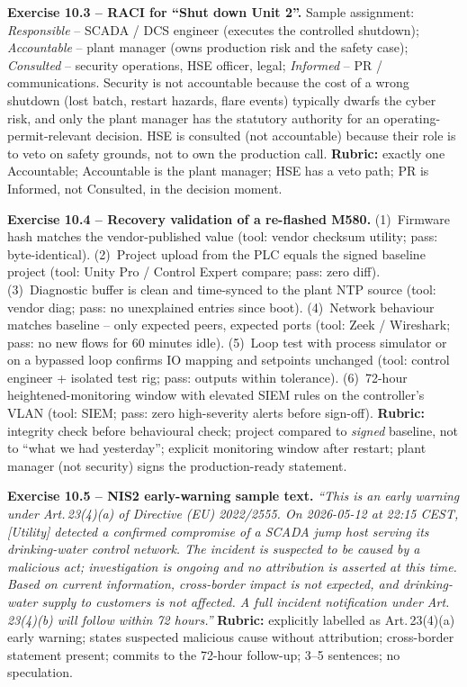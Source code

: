 \documentclass[11pt,a4paper]{article}
\begin{document}
\begin{solutionbox}
\textbf{Exercise 10.3 -- RACI for ``Shut down Unit 2''.}
Sample assignment: \emph{Responsible} -- SCADA / DCS engineer (executes the
controlled shutdown); \emph{Accountable} -- plant manager (owns production
risk and the safety case); \emph{Consulted} -- security operations, HSE
officer, legal; \emph{Informed} -- PR / communications. Security is not
accountable because the cost of a wrong shutdown (lost batch, restart hazards,
flare events) typically dwarfs the cyber risk, and only the plant manager has
the statutory authority for an operating-permit-relevant decision. HSE is
consulted (not accountable) because their role is to veto on safety grounds,
not to own the production call. \textbf{Rubric:} exactly one Accountable;
Accountable is the plant manager; HSE has a veto path; PR is Informed, not
Consulted, in the decision moment.
\end{solutionbox}

\begin{solutionbox}
\textbf{Exercise 10.4 -- Recovery validation of a re-flashed M580.}
(1)~Firmware hash matches the vendor-published value (tool: vendor checksum
utility; pass: byte-identical). (2)~Project upload from the PLC equals the
signed baseline project (tool: Unity Pro / Control Expert compare; pass: zero
diff). (3)~Diagnostic buffer is clean and time-synced to the plant NTP source
(tool: vendor diag; pass: no unexplained entries since boot). (4)~Network
behaviour matches baseline -- only expected peers, expected ports (tool:
Zeek / Wireshark; pass: no new flows for 60 minutes idle). (5)~Loop test with
process simulator or on a bypassed loop confirms IO mapping and setpoints
unchanged (tool: control engineer + isolated test rig; pass: outputs within
tolerance). (6)~72-hour heightened-monitoring window with elevated SIEM rules
on the controller's VLAN (tool: SIEM; pass: zero high-severity alerts before
sign-off). \textbf{Rubric:} integrity check before behavioural check; project
compared to \emph{signed} baseline, not to ``what we had yesterday''; explicit
monitoring window after restart; plant manager (not security) signs the
production-ready statement.
\end{solutionbox}

\begin{solutionbox}
\textbf{Exercise 10.5 -- NIS2 early-warning sample text.}
\emph{``This is an early warning under Art.\,23(4)(a) of Directive (EU)
2022/2555. On 2026-05-12 at 22:15 CEST, [Utility] detected a confirmed
compromise of a SCADA jump host serving its drinking-water control network.
The incident is suspected to be caused by a malicious act; investigation is
ongoing and no attribution is asserted at this time. Based on current
information, cross-border impact is not expected, and drinking-water supply
to customers is not affected. A full incident notification under
Art.\,23(4)(b) will follow within 72 hours.''} \textbf{Rubric:} explicitly
labelled as Art.\,23(4)(a) early warning; states suspected malicious cause
without attribution; cross-border statement present; commits to the 72-hour
follow-up; 3--5 sentences; no speculation.
\end{solutionbox}
\end{document}
